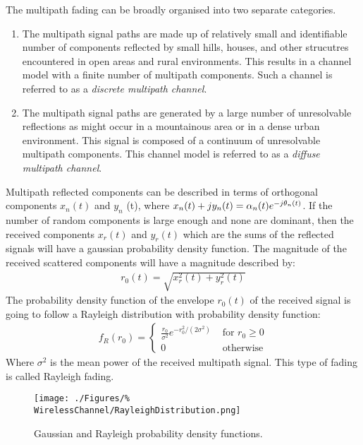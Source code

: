 The multipath fading can be broadly organised into %
two separate categories\cite{Jer00}.
\begin{enumerate}
	\item{The multipath signal paths are made up %
		of relatively small and identifiable number %
		of components reflected by small hills, %
		houses, and other strucutres encountered in %
		open areas and rural environments. This %
		results in a channel model with a finite number %
		of multipath components. Such a channel is %
		referred to as a \emph{discrete multipath channel}.}
	\item{The multipath signal paths are generated by %
		a large number of unresolvable reflections as %
		might occur %
		in a mountainous area or in a dense urban %
		environment. %
		This signal is composed of a continuum of %
		unresolvable multipath components. This %
		channel model is referred to as a \emph{diffuse %
		multipath channel}.}
\end{enumerate}
Multipath reflected components can be described in %
terms of orthogonal components $x_{n}(t)$ and %
$y_{n}$%
(t), where $x_{n}(t) + jy_{n}(t) = \alpha_{n}(t)e^{%
-j\theta_{n}(t)}$. If the number of random components %
is large enough and none are dominant, then the received %
components $x_{r}(t)$ and $y_{r}(t)$ which are the sums %
of the reflected signals will have a gaussian probability %
density function. The magnitude of the received scattered %
components will have a magnitude described by:
\begin{align}
	r_{0}(t) = \sqrt{x_{r}^{2}(t) + y_{r}^{2}(t)}
\end{align}
The probability density function of the envelope $r_{0}(t)$ %
of the received signal is going to follow a Rayleigh distribution %
with probability density function:
\begin{align}
	f_{R}(r_{0}) = \begin{cases}
		\frac{r_{0}}{\sigma^{2}}e^{-r_{0}^{2}/(2\sigma^{2})} %
		& \text{ for } r_{0} \geq 0 \\
		0 & \text{ otherwise}
	\end{cases}
	\label{eq:RayleighPDF}
\end{align}
Where $\sigma^{2}$ is the mean power of the received %
multipath signal. This type of fading is called Rayleigh %
fading.
\begin{figure}[h!]
	\centering
	\texttt{[image: ./Figures/\%
	WirelessChannel/RayleighDistribution.png]}
	\caption{Gaussian and Rayleigh probability 
	density functions.%
	\cite{Jakes74}}
	\label{fig:RayleighDistribution}
\end{figure}

